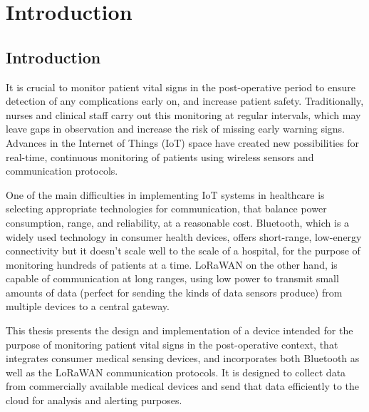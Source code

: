 \chapter{Introduction}

\section{Introduction} %
It is crucial to monitor patient vital signs in the post-operative period to ensure detection of any complications early on, and increase patient safety. Traditionally, nurses and clinical staff carry out this monitoring at regular intervals, which may leave gaps in observation and increase the risk of missing early warning signs. Advances in the Internet of Things (IoT) space have created new possibilities for real-time, continuous monitoring of patients using wireless sensors and communication protocols.

One of the main difficulties in implementing IoT systems in healthcare is selecting appropriate technologies for communication, that balance power consumption, range, and reliability, at a reasonable cost. Bluetooth, which is a widely used technology in consumer health devices, offers short-range, low-energy connectivity but it doesn't scale well to the scale of a hospital, for the purpose of monitoring hundreds of patients at a time. LoRaWAN on the other hand, is capable of communication at long ranges, using low power to transmit small amounts of data (perfect for sending the kinds of data sensors produce) from multiple devices to a central gateway.

This thesis presents the design and implementation of a device intended for the purpose of monitoring patient vital signs in the post-operative context, that integrates consumer medical sensing devices, and incorporates both Bluetooth as well as the LoRaWAN communication protocols. It is designed to collect data from commercially available medical devices and send that data efficiently to the cloud for analysis and alerting purposes.

